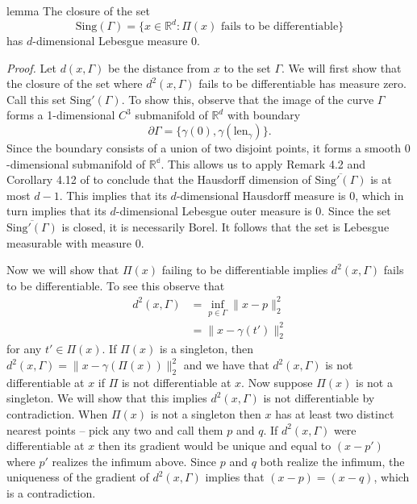 \documentclass[11pt]{article}
\begin{document}
\begin{restatable}{lemma}{} \label{lemma: singular set measure}
    The closure of the set 
    \begin{equation}\text{Sing}(\Gamma) = \{x \in \mathbb{R}^d: \Pi(x) \text{ fails to be differentiable}\} \label{eq: singular set}
    \end{equation}
    has $d$-dimensional Lebesgue measure $0$. 
\end{restatable}
\noindent \textit{Proof.} Let $d(x, \Gamma)$ be the distance from $x$ to the set $\Gamma$. We will first show that the closure of the set where $d^2(x,\Gamma)$ fails to be differentiable has measure zero. Call this set $\text{Sing}'(\Gamma)$. To show this, observe that the image of the curve $\Gamma$ forms a 1-dimensional $C^3$ submanifold of $\mathbb{R}^d$ with boundary
\[\partial\Gamma = \{\gamma(0), \gamma(\text{len}_{\gamma})\}.\]
Since the boundary consists of a union of two disjoint points, it forms a smooth $0$-dimensional submanifold of $\mathbb{R^d}$. This allows us to apply Remark 4.2 and Corollary 4.12 of \citet{mantegazza2002hamilton} to conclude that the Hausdorff dimension of $\overline{\text{Sing}'(\Gamma)}$ is at most $d-1$. This implies that its $d$-dimensional Hausdorff measure is $0$, which in turn implies that its $d$-dimensional Lebesgue outer measure is $0$. Since the set $\overline{\text{Sing}'(\Gamma)}$ is closed, it is necessarily Borel. It follows that the set is Lebesgue measurable with measure $0$. 

Now we will show that $\Pi(x)$ failing to be differentiable implies $d^2(x, \Gamma)$ fails to be differentiable. To see this observe that
\begin{align}
    d^2(x, \Gamma) &= \inf_{p \in \Gamma}\|x - p\|_2^2 \\ \label{eq: distance to Gamma}
    &= \|x - \gamma(t')\|_2^2
\end{align}
for any $t' \in \Pi(x)$. If $\Pi(x)$ is a singleton, then $d^2(x,\Gamma) = \|x - \gamma(\Pi(x))\|_2^2$ and we have that $d^2(x,\Gamma)$ is not differentiable at $x$ if $\Pi$ is not differentiable at $x$. Now suppose $\Pi(x)$ is not a singleton. We will show that this implies $d^2(x,\Gamma)$ is not differentiable by contradiction. When $\Pi(x)$ is not a singleton then $x$ has at least two distinct nearest points -- pick any two and call them $p$ and $q$. If $d^2(x,\Gamma)$ were differentiable at $x$ then its gradient would be unique and equal to $(x-p')$ where $p'$ realizes the infimum above. Since $p$ and $q$ both realize the infimum, the uniqueness of the gradient of $d^2(x, \Gamma)$ implies that $(x - p) = (x-q)$, which is a contradiction.
\end{document}
